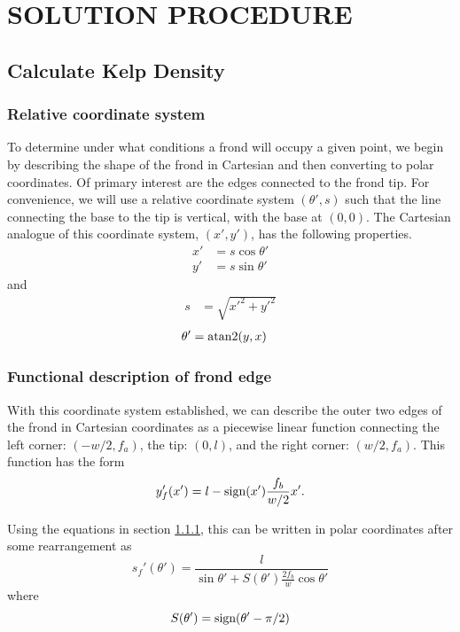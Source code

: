 \chapter{SOLUTION PROCEDURE}
\section{Calculate Kelp Density}
\subsection{Relative coordinate system}
\label{sec:rel_coords}
To determine under what conditions a frond will occupy a given point, we begin by
describing the shape of the frond in Cartesian and then converting to polar coordinates.
Of primary interest are the edges connected to the frond tip.
For convenience, we will use a relative coordinate system $(\theta',s)$ such that the line connecting the base to the tip is vertical, with the base at $(0,0)$.
The Cartesian analogue of this coordinate system, $(x',y')$, has the following properties.
\begin{align}
	x' &= s\cos\theta' \\ 
	y' &= s\sin\theta'
\end{align}
and
\begin{align}
	s &= \sqrt{x'^2+y'^2}
\end{align}
\vspace{-1em}
\begin{align}
	\theta' &= \operatorname{atan2}(y, x)
\end{align}

\subsection{Functional description of frond edge}
With this coordinate system established, we can describe the outer two edges of the frond in Cartesian coordinates as a piecewise linear function connecting the left corner: $(-w/2,f_a)$, the tip: $(0,l)$, and the right corner: $(w/2,f_a)$.
This function has the form
\begin{equation}
	y'_f(x') = l-\mbox{sign}(x')\frac{f_b}{w/2}x'.
\end{equation}

Using the equations in section \ref{sec:rel_coords}, this can be written in polar coordinates after some rearrangement as
\begin{equation}
	s_f'(\theta') = \frac{l}{\sin\theta' + S(\theta')\frac{2f_b}{w}\cos\theta'}
\end{equation}
where
\begin{equation}
	S(\theta') = \mbox{sign}(\theta'-\pi/2)
\end{equation}

